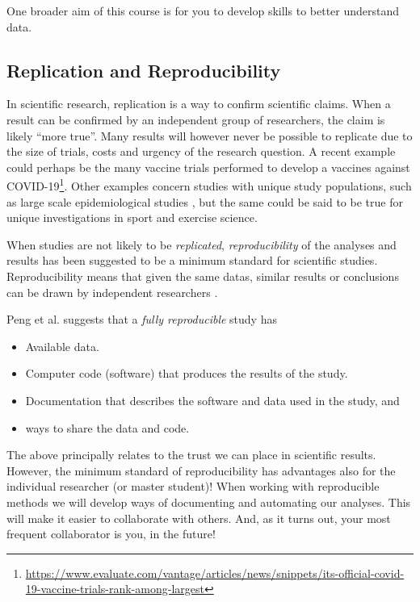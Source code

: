 \documentclass[
]{article}
\providecommand{\tightlist}{%
  \setlength{\itemsep}{0pt}\setlength{\parskip}{0pt}}
\begin{document}
One broader aim of this course is for you to develop skills to better understand data.

\hypertarget{replication-and-reproducibility}{%
\subsection{Replication and Reproducibility}\label{replication-and-reproducibility}}

In scientific research, replication is a way to confirm scientific claims. When a result can be confirmed by an independent group of researchers, the claim is likely ``more true''. Many results will however never be possible to replicate due to the size of trials, costs and urgency of the research question. A recent example could perhaps be the many vaccine trials performed to develop a vaccines against COVID-19\footnote{\url{https://www.evaluate.com/vantage/articles/news/snippets/its-official-covid-19-vaccine-trials-rank-among-largest}}. Other examples concern studies with unique study populations, such as large scale epidemiological studies \citep{RN1492}, but the same could be said to be true for unique investigations in sport and exercise science.

When studies are not likely to be \emph{replicated}, \emph{reproducibility} of the analyses and results has been suggested to be a minimum standard for scientific studies. Reproducibility means that given the same datas, similar results or conclusions can be drawn by independent researchers \citep{RN1492}.

Peng et al. \citep{RN1492} suggests that a \emph{fully reproducible} study has

\begin{itemize}
\tightlist
\item
  Available data.
\item
  Computer code (software) that produces the results of the study.
\item
  Documentation that describes the software and data used in the study, and
\item
  ways to share the data and code.
\end{itemize}

The above principally relates to the trust we can place in scientific results. However, the minimum standard of reproducibility has advantages also for the individual researcher (or master student)! When working with reproducible methods we will develop ways of documenting and automating our analyses. This will make it easier to collaborate with others. And, as it turns out, your most frequent collaborator is you, in the future!
\end{document}
